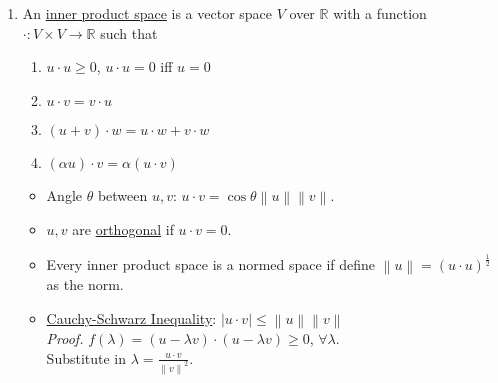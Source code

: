 \documentclass[%
 aip,
 jmp,%
 amsmath,amssymb,
 reprint,%
]{revtex4-1}
\def\R{{\mathbb R}}
\def\a{\alpha}
\def\l{\lambda}
\renewenvironment{proof}{\color{gray}\footnotesize\emph{Proof.}}{}
\newcommand{\norm}[1]{\left\lVert#1\right\rVert}
\newcommand{\defn}[1]{\underline{#1}}
\begin{document}
\begin{enumerate}
\begin{itemize}
            \begin{proof}
              Minkowski's inequality:\\
              $ \left(\sum_{k}^{n}|x_k+y_k|^p\right)^{\frac{1}{p}} \le
                   \left(\sum_{k}^{n}|x_k|^p\right)^{\frac{1}{p}} +
                   \left(\sum_{k}^{n}|y_k|^p\right)^{\frac{1}{p}}
              $
            \end{proof}

        \item If $1 \le p \le q \le \infty$, then $\norm{x}_p \ge \norm{x}_q$.

            \begin{proof}
              Normalize $x$ to $\frac{x}{\norm{x}_p}$ so that $\norm{x}_p=1$.
              Then it is easy to see $\norm{x}_q \le 1$ because for each
              element $|x_i|^q \le |x_i|^p$.
            \end{proof}
            
      \end{itemize}

    \item An \defn{inner product space} is a vector space $V$ over $\R$ with a
    function $\boldsymbol{\cdot}: V \times V \to \R$ such that
        \begin{enumerate}
          \item $u \cdot u \ge 0$, $u \cdot u = 0$ iff $u=0$
          \item $u \cdot v = v \cdot u$
          \item $(u+v)\cdot w = u \cdot w + v \cdot w$
          \item $(\a u)\cdot v = \a (u\cdot v)$
        \end{enumerate}
        \begin{itemize}
          \item Angle $\theta$ between $u,v$: $u \cdot v=\cos\theta \norm{u}\norm{v}$.
          \item $u,v$ are \defn{orthogonal} if $u \cdot v=0$.
          \item Every inner product space is a normed space if define
          $\norm{u} = (u\cdot u)^{\frac{1}{2}}$ as the norm.
          \item \defn{Cauchy-Schwarz Inequality}: $|u\cdot v| \le \norm{u}\norm{v}$\\
              \begin{proof}
                $f(\l)=(u-\l v)\cdot (u-\l v) \ge 0$, $\forall\l$.\\
                Substitute in $\l=\frac{u\cdot v}{\norm{v}^2}$.
              \end{proof}
        \end{itemize}
\end{enumerate}
\end{document}
